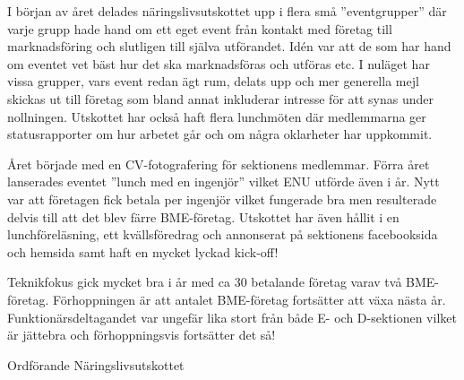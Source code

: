 \documentclass[../_main/handlingar.tex]{subfiles}
\begin{document}
I början av året delades näringslivsutskottet upp i flera små ”eventgrupper” där varje grupp hade hand om ett eget event från kontakt med företag till marknadsföring och slutligen till själva utförandet. Idén var att de som har hand om eventet vet bäst hur det ska marknadsföras och utföras etc. I nuläget har vissa grupper, vars event redan ägt rum, delats upp och mer generella mejl skickas ut till företag som bland annat inkluderar intresse för att synas under nollningen. Utskottet har också haft flera lunchmöten där medlemmarna ger statusrapporter om hur arbetet går och om några oklarheter har uppkommit.

Året började med en CV-fotografering för sektionens medlemmar.  Förra året lanserades eventet ”lunch med en ingenjör” vilket ENU utförde även i år. Nytt var att företagen fick betala per ingenjör vilket fungerade bra men resulterade delvis till att det blev färre BME-företag. Utskottet har även hållit i en lunchföreläsning, ett kvällsföredrag och annonserat på sektionens facebooksida och hemsida samt haft en mycket lyckad kick-off!

Teknikfokus gick mycket bra i år med ca 30 betalande företag varav två BME-företag. Förhoppningen är att antalet BME-företag fortsätter att växa nästa år. Funktionärsdeltagandet var ungefär lika stort från både E- och D-sektionen vilket är jättebra och förhoppningsvis fortsätter det så!
\begin{signatures}{1}
    \mvh
    \signature{Josefine Sandström}{Ordförande Näringslivsutskottet}
\end{signatures}
\end{document}
